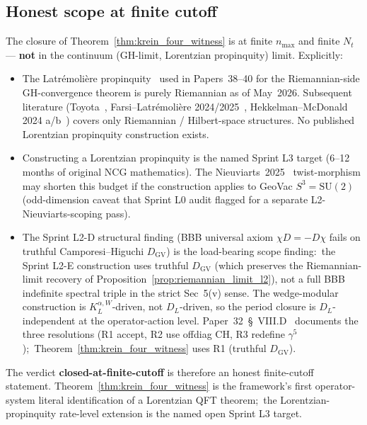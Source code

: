 \documentclass[11pt,a4paper]{article}
\theoremstyle{plain}
\theoremstyle{definition}
\newcommand{\sthree}{S^{3}}
\begin{document}
\subsection{Honest scope at finite cutoff}
\label{sec:lorentzian_closure_scope}

The closure of Theorem~\ref{thm:krein_four_witness} is at finite
$n_{\max}$ and finite $N_t$ — \textbf{not} in the continuum
(GH-limit, Lorentzian propinquity) limit.  Explicitly:

\begin{itemize}\setlength{\itemsep}{2pt}
\item The Latr\'emoli\`ere
propinquity~\cite{latremoliere2018, latremoliere_metric_st_2017} used
in Papers~38--40 for the Riemannian-side GH-convergence theorem is
purely Riemannian as of May~2026.  Subsequent
literature (Toyota~\cite{toyota2023}, Farsi--Latr\'emoli\`ere
2024/2025~\cite{farsi_latremoliere2024, farsi_latremoliere2025},
Hekkelman--McDonald 2024 a/b~\cite{hekkelman_mcdonald2024,
hekkelman_mcdonald2024b}) covers only Riemannian / Hilbert-space
structures.  No published Lorentzian propinquity construction exists.

\item Constructing a Lorentzian propinquity is the named Sprint L3
target (6--12 months of original NCG mathematics).  The
Nieuviarts~2025~\cite{nieuviarts2025a, nieuviarts2025b_proceedings}
twist-morphism may shorten this budget if the construction applies
to GeoVac $\sthree = \mathrm{SU}(2)$ (odd-dimension caveat that
Sprint L0 audit flagged for a separate L2-Nieuviarts-scoping pass).

\item The Sprint L2-D structural finding (BBB universal axiom
$\chi D = -D \chi$ fails on truthful Camporesi--Higuchi
$D_{\mathrm{GV}}$) is the load-bearing scope finding:\ the Sprint L2-E
construction uses truthful $D_{\mathrm{GV}}$ (which preserves the
Riemannian-limit recovery of Proposition~\ref{prop:riemannian_limit_l2}),
not a full BBB indefinite spectral triple in the strict Sec~5(v)
sense.  The wedge-modular construction is $K_L^{\alpha, W}$-driven,
not $D_L$-driven, so the period closure is $D_L$-independent at the
operator-action level.  Paper~32~\S~VIII.D~\cite{paper32} documents
the three resolutions (R1 accept, R2 use offdiag CH, R3 redefine
$\gamma^5$);\ Theorem~\ref{thm:krein_four_witness} uses R1 (truthful
$D_{\mathrm{GV}}$).
\end{itemize}

The verdict \textbf{closed-at-finite-cutoff} is therefore an honest
finite-cutoff statement.  Theorem~\ref{thm:krein_four_witness} is
the framework's first operator-system literal identification of a
Lorentzian QFT theorem;\ the Lorentzian-propinquity rate-level
extension is the named open Sprint L3 target.
\end{document}
